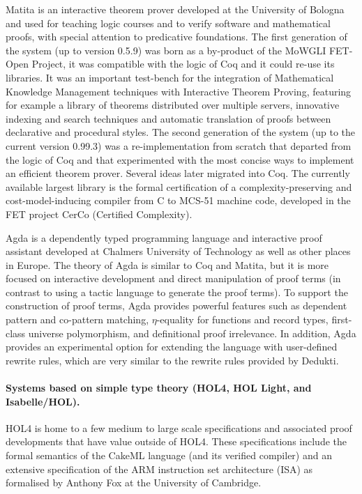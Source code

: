 Matita is an interactive theorem prover developed at the University of
Bologna and used for teaching logic courses and to verify software and
mathematical proofs, with special attention to predicative
foundations. The first generation of the system (up to version 0.5.9)
was born as a by-product of the MoWGLI FET-Open Project, it was
compatible with the logic of Coq and it could re-use its libraries. It
was an important test-bench for the integration of Mathematical
Knowledge Management techniques with Interactive Theorem Proving,
featuring for example a library of theorems distributed over multiple
servers, innovative indexing and search techniques and automatic
translation of proofs between declarative and procedural styles. The
second generation of the system (up to the current version 0.99.3) was
a re-implementation from scratch that departed from the logic of Coq
and that experimented with the most concise ways to implement an
efficient theorem prover. Several ideas later migrated into Coq. The
currently available largest library is the formal certification of a
complexity-preserving and cost-model-inducing compiler from C to
MCS-51 machine code, developed in the FET project CerCo (Certified
Complexity).

Agda is a dependently typed programming language and interactive proof
assistant developed at Chalmers University of Technology as well as
other places in Europe. The theory of Agda is similar to Coq and
Matita, but it is more focused on interactive development and direct
manipulation of proof terms (in contrast to using a tactic language to
generate the proof terms). To support the construction of proof terms,
Agda provides powerful features such as dependent pattern and
co-pattern matching, $\eta$-equality for functions and record types,
first-class universe polymorphism, and definitional proof
irrelevance. In addition, Agda provides an experimental option for
extending the language with user-defined rewrite rules, which are very
similar to the rewrite rules provided by Dedukti.

\paragraph*{Systems based on simple type theory (HOL4, HOL Light, and Isabelle/HOL).}

HOL4 is home to a few medium to large scale specifications and
associated proof developments that have value outside of HOL4. These
specifications include the formal semantics of the CakeML language
(and its verified compiler) and an extensive specification of the ARM
instruction set architecture (ISA) as formalised by Anthony Fox at the
University of Cambridge.

